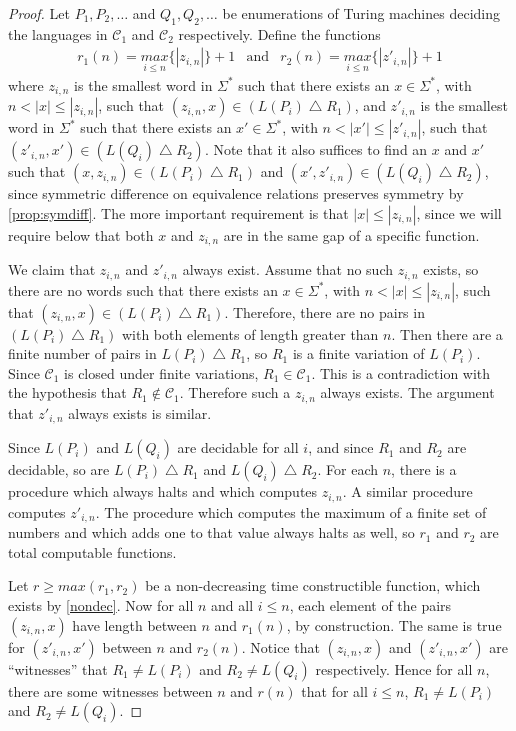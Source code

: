 \documentclass[draft]{article}
\theoremstyle{definition} \newtheorem{openproblem}[openproblem]{Open problem}
\theoremstyle{definition} \newtheorem{definition}[definition]{Definition}
\theoremstyle{remark} \newtheorem{remark}{Remark}
\newcommand{\symdiff}{\bigtriangleup} %
\newcommand{\pair}[2]{\langle#1,#2\rangle} %
\begin{document}
\begin{proof} %
  Let $P_1, P_2, \ldots$ and $Q_1, Q_2, \ldots$ be enumerations of Turing machines deciding the languages in $\mathcal{C}_1$ and $\mathcal{C}_2$ respectively.
  Define the functions
  \begin{eqnarray*}
    r_1(n)=\underset{i\leq n}{max}\{|z_{i,n}|\}+1 & \text{and} &
    r_2(n)=\underset{i\leq n}{max}\{|z'_{i,n}|\}+1
  \end{eqnarray*}
  where $z_{i,n}$ is the smallest word in $\Sigma^*$ such that there exists an $x\in\Sigma^*$, with $n<|x|\leq|z_{i,n}|$, such that $(z_{i,n}, x)\in(L(P_i)\symdiff R_1)$, and $z'_{i,n}$ is the smallest word in $\Sigma^*$ such that there exists an $x'\in\Sigma^*$, with $n<|x'|\leq|z'_{i,n}|$, such that $(z'_{i,n}, x')\in(L(Q_i)\symdiff R_2)$.
  Note that it also suffices to find an $x$ and $x'$ such that $(x, z_{i,n})\in(L(P_i)\symdiff R_1)$ and $(x', z'_{i,n})\in(L(Q_i)\symdiff R_2)$, since symmetric difference on equivalence relations preserves symmetry by \autoref{prop:symdiff}.
  The more important requirement is that $|x|\leq|z_{i,n}|$, since we will require below that both $x$ and $z_{i,n}$ are in the same gap of a specific function.

  We claim that $z_{i,n}$ and $z'_{i,n}$ always exist.
  Assume that no such $z_{i,n}$ exists, so there are no words such that there exists an $x\in\Sigma^*$, with $n<|x|\leq|z_{i,n}|$, such that $(z_{i,n}, x)\in(L(P_i)\symdiff R_1)$.
  Therefore, there are no pairs in $(L(P_i)\symdiff R_1)$ with both elements of length greater than $n$.
  Then there are a finite number of pairs in $L(P_i)\symdiff R_1$, so $R_1$ is a finite variation of $L(P_i)$.
  Since $\mathcal{C}_1$ is closed under finite variations, $R_1\in\mathcal{C}_1$.
  This is a contradiction with the hypothesis that $R_1\notin\mathcal{C}_1$.
  Therefore such a $z_{i,n}$ always exists.
  The argument that $z'_{i,n}$ always exists is similar.

  Since $L(P_i)$ and $L(Q_i)$ are decidable for all $i$, and since $R_1$ and $R_2$ are decidable, so are $L(P_i)\symdiff R_1$ and $L(Q_i)\symdiff R_2$.
  For each $n$, there is a procedure which always halts and which computes $z_{i,n}$.
  A similar procedure computes $z'_{i,n}$.
  The procedure which computes the maximum of a finite set of numbers and which adds one to that value always halts as well, so $r_1$ and $r_2$ are total computable functions.

  Let $r\ge max(r_1,r_2)$ be a non-decreasing time constructible function, which exists by \autoref{nondec}.
  Now for all $n$ and all $i\leq n$, each element of the pairs $(z_{i,n},x)$ have length between $n$ and $r_1(n)$, by construction.
  The same is true for $(z'_{i,n}, x')$ between $n$ and $r_2(n)$.
  Notice that $(z_{i,n}, x)$ and $(z'_{i,n}, x')$ are ``witnesses'' that $R_1\neq L(P_i)$ and $R_2\neq L(Q_i)$ respectively.
  Hence for all $n$, there are some witnesses between $n$ and $r(n)$ that for all $i\leq n$, $R_1\neq L(P_i)$ and $R_2\neq L(Q_i)$.


\end{proof}
\end{document}
